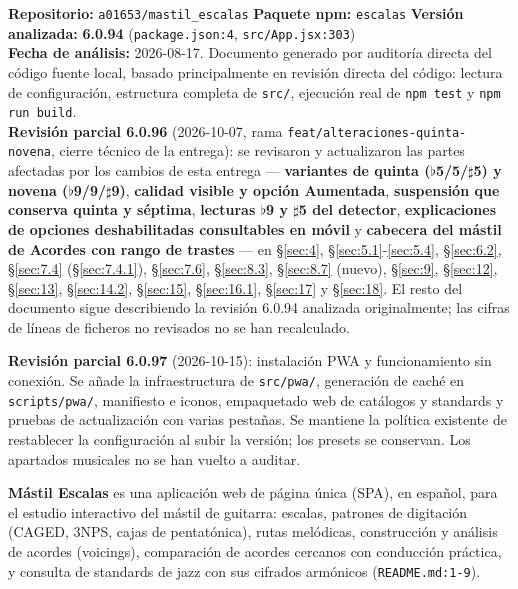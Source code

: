 \documentclass[a4paper,11pt,oneside]{report}
\newcommand{\Sref}[1]{\S\ref{#1}}
\newcommand{\flt}{\ensuremath{\flat}}
\newcommand{\shp}{\ensuremath{\sharp}}
\begin{document}
\begin{notabox}
\textbf{Repositorio:} \lstinline!a01653/mastil_escalas! \quad\textbullet\quad
\textbf{Paquete npm:} \lstinline!escalas! \quad\textbullet\quad
\textbf{Versión analizada:} \textbf{6.0.94} (\lstinline!package.json:4!, \lstinline!src/App.jsx:303!)\\[4pt]
\textbf{Fecha de análisis:} 2026-08-17. Documento generado por auditoría directa del código fuente local, basado principalmente en revisión directa del código: lectura de configuración, estructura completa de \lstinline!src/!, ejecución real de \lstinline!npm test! y \lstinline!npm run build!.\\[4pt]
\textbf{Revisión parcial 6.0.96} (2026-10-07, rama \lstinline!feat/alteraciones-quinta-novena!, cierre técnico de la entrega): se revisaron y actualizaron las partes afectadas por los cambios de esta entrega --- \textbf{variantes de quinta (\flt5/5/\shp5) y novena (\flt9/9/\shp9)}, \textbf{calidad visible y opción Aumentada}, \textbf{suspensión que conserva quinta y séptima}, \textbf{lecturas \flt9 y \shp5 del detector}, \textbf{explicaciones de opciones deshabilitadas consultables en móvil} y \textbf{cabecera del mástil de Acordes con rango de trastes} --- en \Sref{sec:4}, \Sref{sec:5.1}-\ref{sec:5.4}, \Sref{sec:6.2}, \Sref{sec:7.4} (\Sref{sec:7.4.1}), \Sref{sec:7.6}, \Sref{sec:8.3}, \Sref{sec:8.7} (nuevo), \Sref{sec:9}, \Sref{sec:12}, \Sref{sec:13}, \Sref{sec:14.2}, \Sref{sec:15}, \Sref{sec:16.1}, \Sref{sec:17} y \Sref{sec:18}. El resto del documento sigue describiendo la revisión 6.0.94 analizada originalmente; las cifras de líneas de ficheros no revisados no se han recalculado.

\smallskip
\textbf{Revisión parcial 6.0.97} (2026-10-15): instalación PWA y
funcionamiento sin conexión. Se añade la infraestructura de
\texttt{src/pwa/}, generación de caché en \texttt{scripts/pwa/},
manifiesto e iconos, empaquetado web de catálogos y standards y pruebas
de actualización con varias pestañas. Se mantiene la política existente
de restablecer la configuración al subir la versión; los presets se
conservan. Los apartados musicales no se han vuelto a auditar.
\end{notabox}

\textbf{Mástil Escalas} es una aplicación web de página única (SPA), en español, para el estudio interactivo del mástil de guitarra: escalas, patrones de digitación (CAGED, 3NPS, cajas de pentatónica), rutas melódicas, construcción y análisis de acordes (voicings), comparación de acordes cercanos con conducción práctica, y consulta de standards de jazz con sus cifrados armónicos (\lstinline!README.md:1-9!).
\end{document}
